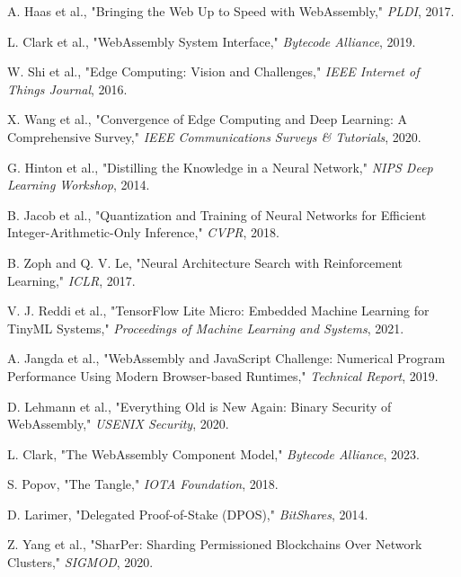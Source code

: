 \documentclass[11pt,a4paper]{article}
\begin{document}
\begin{thebibliography}{99}
 A. Haas et al., "Bringing the Web Up to Speed with WebAssembly," \textit{PLDI}, 2017.

 L. Clark et al., "WebAssembly System Interface," \textit{Bytecode Alliance}, 2019.

 W. Shi et al., "Edge Computing: Vision and Challenges," \textit{IEEE Internet of Things Journal}, 2016.

 X. Wang et al., "Convergence of Edge Computing and Deep Learning: A Comprehensive Survey," \textit{IEEE Communications Surveys \& Tutorials}, 2020.

 G. Hinton et al., "Distilling the Knowledge in a Neural Network," \textit{NIPS Deep Learning Workshop}, 2014.

 B. Jacob et al., "Quantization and Training of Neural Networks for Efficient Integer-Arithmetic-Only Inference," \textit{CVPR}, 2018.

 B. Zoph and Q. V. Le, "Neural Architecture Search with Reinforcement Learning," \textit{ICLR}, 2017.

 V. J. Reddi et al., "TensorFlow Lite Micro: Embedded Machine Learning for TinyML Systems," \textit{Proceedings of Machine Learning and Systems}, 2021.

 A. Jangda et al., "WebAssembly and JavaScript Challenge: Numerical Program Performance Using Modern Browser-based Runtimes," \textit{Technical Report}, 2019.

 D. Lehmann et al., "Everything Old is New Again: Binary Security of WebAssembly," \textit{USENIX Security}, 2020.

 L. Clark, "The WebAssembly Component Model," \textit{Bytecode Alliance}, 2023.

 S. Popov, "The Tangle," \textit{IOTA Foundation}, 2018.

 D. Larimer, "Delegated Proof-of-Stake (DPOS)," \textit{BitShares}, 2014.

 Z. Yang et al., "SharPer: Sharding Permissioned Blockchains Over Network Clusters," \textit{SIGMOD}, 2020.

\end{thebibliography}
\end{document}
